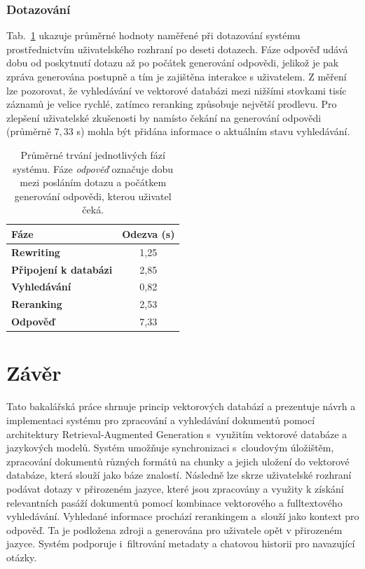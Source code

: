 \subsection{Dotazování}
Tab.~\ref{tab:latence} ukazuje průměrné hodnoty naměřené při dotazování systému prostřednictvím uživatelského rozhraní po deseti dotazech. Fáze odpověď udává dobu od poskytnutí dotazu až po počátek generování odpovědi, jelikož je pak zpráva generována postupně a tím je zajištěna interakce s uživatelem. Z měření lze pozorovat, že vyhledávání ve vektorové databázi mezi nižšími stovkami tisíc záznamů je velice rychlé, zatímco reranking způsobuje největší prodlevu. Pro zlepšení uživatelské zkušenosti by namísto čekání na generování odpovědi (průměrně $7{,}33$ s) mohla být přidána informace o aktuálním stavu vyhledávání.
\begin{table}[H]
    \centering
    \renewcommand{\arraystretch}{1.2}
    \begin{tabular}{|l|c|}
        \hline
        \textbf{Fáze} & \textbf{Odezva (s)} \\
        \hline
        \textbf{Rewriting}            & 1{,}25 \\
        \textbf{Připojení k databázi}         & 2{,}85 \\
        \textbf{Vyhledávání}        & 0{,}82 \\
        \textbf{Reranking}              & 2{,}53 \\
        \textbf{Odpověď}  & 7{,}33 \\
        \hline
    \end{tabular}
    \caption{Průměrné trvání jednotlivých fází systému. Fáze \textit{odpověď} označuje dobu mezi posláním dotazu a počátkem generování odpovědi, kterou uživatel čeká.}
    \label{tab:latence}
\end{table}


\chapter{Závěr}

Tato bakalářská práce shrnuje princip vektorových databází a prezentuje návrh a implementaci systému pro zpracování a vyhledávání dokumentů pomocí architektury Retrieval-Augmented Generation s~využitím vektorové databáze a jazykových modelů. Systém umožňuje synchronizaci s~cloudovým úložištěm, zpracování dokumentů různých formátů na chunky a jejich uložení do vektorové databáze, která slouží jako báze znalostí. Následně lze skrze uživatelské rozhraní podávat dotazy v přirozeném jazyce, které jsou zpracovány a využity k získání relevantních pasáží dokumentů pomocí kombinace vektorového a fulltextového vyhledávání. Vyhledané informace prochází rerankingem a~slouží jako kontext pro odpověď. Ta je podložena zdroji a generována pro uživatele opět v přirozeném jazyce. Systém podporuje i~filtrování metadaty a chatovou historii pro navazující otázky. 

